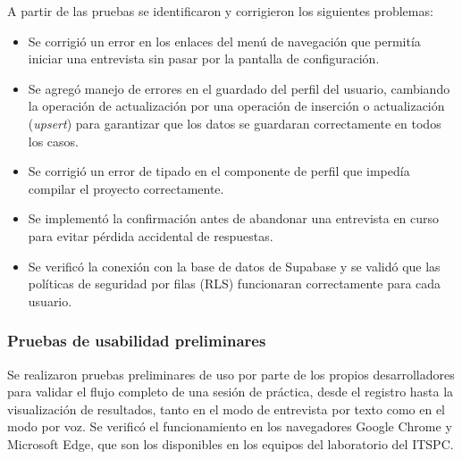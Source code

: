 A partir de las pruebas se identificaron y corrigieron los siguientes
problemas:

\begin{itemize}
    \item Se corrigió un error en los enlaces del menú de navegación
    que permitía iniciar una entrevista sin pasar por la pantalla
    de configuración.

    \item Se agregó manejo de errores en el guardado del perfil
    del usuario, cambiando la operación de actualización por una
    operación de inserción o actualización (\textit{upsert}) para
    garantizar que los datos se guardaran correctamente en todos
    los casos.

    \item Se corrigió un error de tipado en el componente de perfil
    que impedía compilar el proyecto correctamente.

    \item Se implementó la confirmación antes de abandonar una
    entrevista en curso para evitar pérdida accidental de respuestas.

    \item Se verificó la conexión con la base de datos de Supabase
    y se validó que las políticas de seguridad por filas (RLS)
    funcionaran correctamente para cada usuario.
\end{itemize}

\subsubsection{Pruebas de usabilidad preliminares}

Se realizaron pruebas preliminares de uso por parte de los propios
desarrolladores para validar el flujo completo de una sesión de
práctica, desde el registro hasta la visualización de resultados,
tanto en el modo de entrevista por texto como en el modo por voz.
Se verificó el funcionamiento en los navegadores Google Chrome y
Microsoft Edge, que son los disponibles en los equipos del
laboratorio del ITSPC.


